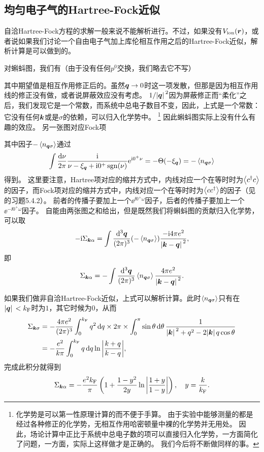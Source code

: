 \subsection{均匀电子气的Hartree-Fock近似}

自洽Hartree-Fock方程的求解一般来说不能解析进行。不过，如果没有$V_\text{ion}(\vb*{r})$，或者说如果我们讨论一个自由电子气加上库伦相互作用之后的Hartree-Fock近似，解析计算是可以做到的。

对蝌蚪图，我们有（由于没有任何$p^0$交换，我们略去它不写）

其中期望值是相互作用修正后的。虽然$\vb*{q} \to 0$时这一项发散，但那是因为相互作用线的修正没有做，或者说屏蔽效应没有考虑。
$1 / \abs*{\vb*{q}}^2$因为屏蔽修正而“柔化”之后，我们发现它是一个常数，而系统中总电子数目不变，因此，上式是一个常数：它没有任何$\vb*{k}$或是$\sigma$的依赖，可以归入化学势中。%
\footnote{
    化学势是可以第一性原理计算的而不便于手算。
    由于实验中能够测量的都是经过各种修正的化学势，无相互作用哈密顿量中裸的化学势并无用处。
    因此，场论计算中正比于系统中总电子数的项可以直接归入化学势，一方面简化了问题，一方面，实际上这样做才是正确的。
    我们今后将不断做同样的事。
}%
因此蝌蚪图实际上没有什么有趣的效应。
另一张图对应Fock项

其中因子$- \expval{n_{\vb*{q} \sigma}}$通过
\[
    \int \frac{\dd{\nu}}{2 \pi} \frac{\mathrm{i}}{\nu - \xi_{\vb*{q}} + \mathrm{i} 0^+ \operatorname{sgn}(\nu)} \mathrm{e}^{\mathrm{i} 0^+ \nu} = - \Theta(- \xi_{\vb*{q}}) = - \expval{n_{\vb*{q} \sigma}}
\]
得到。
这里要注意，Hartree项对应的缩并方式中，内线对应一个在等时时为$\expval{c^\dagger c}$的因子，而Fock项对应的缩并方式中，内线对应一个在等时时为$\expval{c c^\dagger}$的因子（见\cite{wen-qft}的习题5.4.2）。
前者的传播子要加上一个$\ee^{\ii 0^+ \omega}$因子，后者的传播子要加上一个$\ee^{- \ii 0^+ \omega}$因子。
自能由两张图之和给出，但是既然我们将蝌蚪图的贡献归入化学势，可以取
\[
    - \mathrm{i} \Sigma_{\vb*{k} \alpha} = \int \frac{\dd[3]{\vb*{q}}}{(2\pi)^3} (- \expval{n_{\vb*{q} \sigma}}) \frac{- \mathrm{i} 4 \pi e^2}{\abs*{\vb*{k} - \vb*{q}}^2},
\]
即
\begin{equation}
    \Sigma_{\vb*{k} \alpha} = - \int \frac{\dd[3]{\vb*{q}}}{(2\pi)^3} \expval{n_{\vb*{q} \sigma}} \frac{4 \pi e^2}{\abs*{\vb*{k} - \vb*{q}}^2}.
\end{equation}

如果我们做非自洽Hartree-Fock近似，上式可以解析计算。此时$\expval{n_{\vb*{q} \sigma}}$只有在$\abs*{\vb*{q}} < k_\text{F}$时为$1$，其它时候为$0$，从而
\[
    \begin{aligned}
        \Sigma_{\vb*{k} \sigma} &= - \frac{4\pi e^2}{(2\pi)^3} \int_0^{k_\text{F}} q^2 \dd{q} \times 2 \pi \times \int_{0}^{\pi} \sin \theta \dd{\theta} \frac{1}{\abs*{\vb*{k}}^2 + q^2 - 2 \abs*{\vb*{k}} q \cos \theta} \\
        &= - \frac{e^2}{k \pi} \int_0^{k_\text{F}} q \dd{q} \ln\abs{\frac{k+q}{k-q}},
    \end{aligned}
\]
完成此积分就得到
\begin{equation}
    \Sigma_{\vb*{k} \alpha} = - \frac{e^2 k_\text{F}}{\pi} \left( 1 + \frac{1 - y^2}{2y} \ln\abs{\frac{1+y}{1-y}} \right), \quad y = \frac{k}{k_\text{F}}.
    \label{eq:example-electron-hf-self-energy}
\end{equation}

